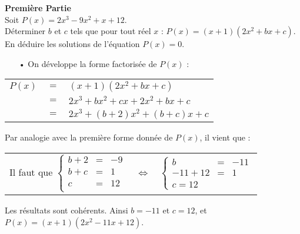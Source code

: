 \textbf{Première Partie} \\

Soit $P(x) = 2x^3 - 9x^2 + x + 12$. \\

Déterminer $b$ et $c$ tels que pour tout réel $x$ : $P(x) = \left(x+1\right)\left(2x^2 + bx + c\right)$. \\

En déduire les solutions de l'équation $P(x) = 0$. \\

\begin{itemize}
\item[•] On développe la forme factorisée de $P(x)$ : 
\end{itemize}

\vspace*{.3cm}

\begin{tabular}{lll}
$P(x)$ & $=$ & $\left(x+1\right)\left(2x^2 + bx + c\right)$ \\
& $=$ & $2x^3 + bx^2 + cx + 2x^2 + bx + c$ \\
& $=$ & $2x^3 + \left(b+2\right)x^2 + \left(b+c\right)x + c$ \\
\end{tabular}

\vspace*{.3cm}

Par analogie avec la première forme donnée de $P(x)$, il vient que : \\

\begin{tabular}{lll}
Il faut que $\left\{
  \begin{array}{rll}
    b+2 & = & -9 \\
    b+c & = & 1 \\
    c   & = & 12 \\
  \end{array}
\right.$
& 
$\Longleftrightarrow$ & 
$\left\{
  \begin{array}{rll}
    b & = & -11 \\
    -11 + 12 & = & 1 \\
    c = 12
  \end{array}
\right.$ \\
\end{tabular}

\vspace*{.3cm}

Les résultats sont cohérents. Ainsi $b = -11$ et $c = 12$, et $P(x) = \left(x+1\right)\left(2x^2 -11x + 12\right)$. \\

